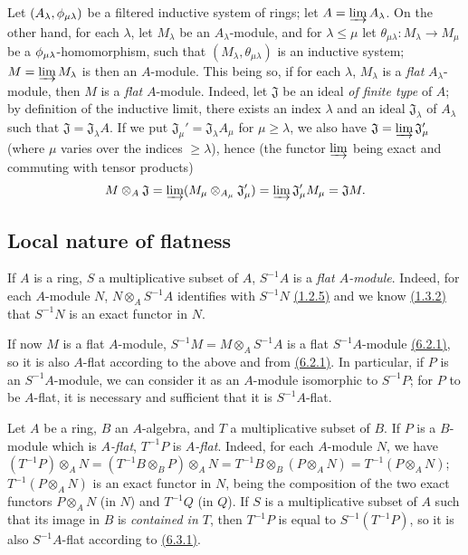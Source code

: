 \begin{env}[6.2.3]
\label{env-0.6.2.3}
Let $(A_\lambda,\phi_{\mu\lambda})$ be a filtered inductive system of rings;
let $A=\varinjlim A_\lambda$. On the other hand, for each $\lambda$, let
$M_\lambda$ be an $A_\lambda$-module, and for $\lambda\leqslant\mu$ let
$\theta_{\mu\lambda}:M_\lambda\to M_\mu$ be a $\phi_{\mu\lambda}$-homomorphism,
such that $(M_\lambda,\theta_{\mu\lambda})$ is an inductive system;
$M=\varinjlim M_\lambda$ is then an $A$-module. This being so, if for each
$\lambda$, $M_\lambda$ is a {\em flat} $A_\lambda$-module, then $M$ is a
{\em flat} $A$-module. Indeed, let $\mathfrak{J}$ be an ideal {\em of finite
type} of $A$; by definition of the inductive limit, there exists an index
$\lambda$ and an ideal $\mathfrak{J}_\lambda$ of $A_\lambda$ such that
$\mathfrak{J}=\mathfrak{J}_\lambda A$. If we put
$\mathfrak{J}_\mu'=\mathfrak{J}_\lambda A_\mu$ for $\mu\geqslant\lambda$, we
also have $\mathfrak{J}=\varinjlim\mathfrak{J}_\mu'$ (where $\mu$ varies over
the indices $\geqslant\lambda$), hence (the functor $\varinjlim$ being exact and
commuting with tensor products)
\[
  M\otimes_A\mathfrak{J}=\varinjlim(M_\mu\otimes_{A_\mu}\mathfrak{J}_\mu')
  =\varinjlim\mathfrak{J}_\mu' M_\mu=\mathfrak{J}M.
\]
\end{env}

\subsection{Local nature of flatness}
\label{subsection-local-nature-of-flatness}

\begin{env}[6.3.1]
\label{env-0.6.3.1}
If $A$ is a ring, $S$ a multiplicative subset of $A$, $S^{-1}A$ is a {\em flat
$A$-module}. Indeed, for each $A$-module $N$, $N\otimes_A S^{-1}A$ identifies
with $S^{-1}N$ \hyperref[env-0.1.2.5]{(1.2.5)} and we know \hyperref[env-0.1.3.2]{(1.3.2)}
that $S^{-1}N$ is an exact functor in $N$.

If now $M$ is a flat $A$-module, $S^{-1}M=M\otimes_A S^{-1}A$ is a flat
$S^{-1}A$-module \hyperref[env-0.6.2.1]{(6.2.1)}, so it is also $A$-flat according to the
above and from \hyperref[env-0.6.2.1]{(6.2.1)}. In particular, if $P$ is an $S^{-1}A$-module,
we can consider it as an $A$-module isomorphic to $S^{-1}P$; for $P$ to be
$A$-flat, it is necessary and sufficient that it is $S^{-1}A$-flat.
\end{env}

\begin{env}[6.3.2]
\label{env-0.6.3.2}
Let $A$ be a ring, $B$ an $A$-algebra, and $T$ a multiplicative subset of $B$.
If $P$ is a $B$-module which is {\em $A$-flat}, $T^{-1}P$ is {\em $A$-flat}.
Indeed, for each $A$-module $N$, we have
$(T^{-1}P)\otimes_A N=(T^{-1}B\otimes_B P)\otimes_A N
  =T^{-1}B\otimes_B(P\otimes_A N)
  =T^{-1}(P\otimes_A N)$; $T^{-1}(P\otimes_A N)$ is an exact functor in $N$,
being the composition of the two exact functors $P\otimes_A N$ (in $N$) and
$T^{-1}Q$ (in $Q$). If $S$ is a multiplicative subset of $A$ such that its image
in $B$ is {\em contained in $T$}, then $T^{-1}P$ is equal to $S^{-1}(T^{-1}P)$,
so it is also $S^{-1}A$-flat according to \hyperref[env-0.6.3.1]{(6.3.1)}.
\end{env}

